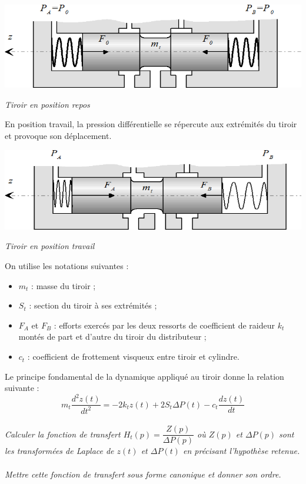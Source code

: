 \documentclass[10pt,oneside]{article}
\begin{document}
\begin{center}
\includegraphics[width=.5\textwidth]{png/image10.png}

\textit{Tiroir en position repos}
\end{center}

En position travail, la pression différentielle se répercute aux extrémités du tiroir et provoque son
déplacement.

\begin{center}
\includegraphics[width=.5\textwidth]{png/image11.png}

\textit{Tiroir en position travail}
\end{center}

On utilise les notations suivantes :
\begin{itemize}
\item $m_t$ : masse du tiroir ;
\item $S_t$ : section du tiroir à ses extrémités ;
\item $F_A$ et $F_B$ : efforts exercés par les deux ressorts de coefficient de raideur $k_t$ montés de part et d’autre
du tiroir du distributeur ;
\item $c_t$ : coefficient de frottement visqueux entre tiroir et cylindre.
\end{itemize}

Le principe fondamental de la dynamique appliqué au tiroir donne la relation suivante :
$$
m_t\dfrac{d^2z(t)}{dt^2} = -2k_tz(t) + 2S_t\Delta P(t) -c_t \dfrac{dz(t)}{dt}
$$

\paragraph{}
\textit{Calculer la fonction de transfert $H_t(p)=\dfrac{Z(p)}{\Delta P(p)}$ 
où $Z(p)$ et $\Delta P(p)$ sont les transformées de Laplace de $z(t)$ et 
$\Delta P(t)$ en précisant l'hypothèse retenue.}

\paragraph{}
\textit{Mettre cette fonction de transfert sous forme canonique et donner son ordre.}
\end{document}
